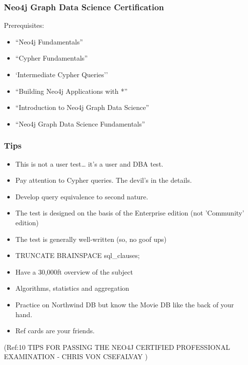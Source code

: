 \begin{frame}\frametitle{Neo4j Graph Data Science  Certification}
Prerequisites:

\begin{itemize}
\item ``Neo4j Fundamentals''
\item ``Cypher Fundamentals''
\item `Intermediate Cypher Queries''
\item ``Building Neo4j Applications with *''
\item ``Introduction to Neo4j Graph Data Science''
\item ``Neo4j Graph Data Science Fundamentals''
\end{itemize}
\end{frame}

\begin{frame}\frametitle{Tips}
\begin{itemize}
\item This is not a user test… it’s a user and DBA test.
\item  Pay attention to Cypher queries. The devil’s in the details.
\item Develop query equivalence to second nature.
\item The test is designed on the basis of the Enterprise edition (not 'Community' edition)
\item The test is generally well-written (so, no goof ups)
\item TRUNCATE BRAINSPACE sql\_clauses;
\item Have a 30,000ft overview of the subject
\item Algorithms, statistics and aggregation
\item Practice on Northwind DB but know the Movie DB like the back of your hand.
\item  Ref cards are your friends.
\end{itemize}

{\tiny (Ref:10 TIPS FOR PASSING THE NEO4J CERTIFIED PROFESSIONAL EXAMINATION
- CHRIS VON CSEFALVAY )}

\end{frame}



